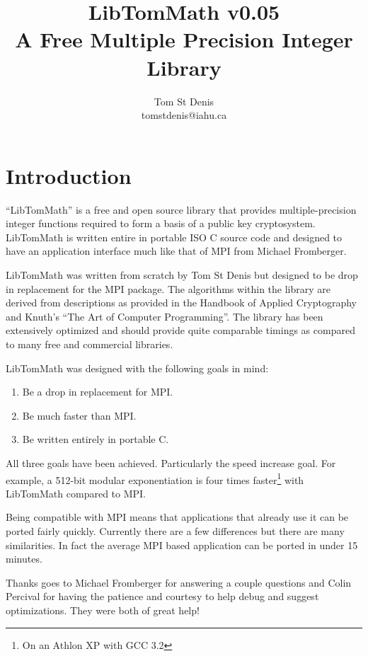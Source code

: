 \documentclass{article}
\begin{document}
\title{LibTomMath v0.05 \\ A Free Multiple Precision Integer Library}
\author{Tom St Denis \\ tomstdenis@iahu.ca}
\maketitle
\newpage

\section{Introduction}
``LibTomMath'' is a free and open source library that provides multiple-precision integer functions required to form a basis
of a public key cryptosystem.  LibTomMath is written entire in portable ISO C source code and designed to have an application
interface much like that of MPI from Michael Fromberger.  

LibTomMath was written from scratch by Tom St Denis but designed to be  drop in replacement for the MPI package.  The 
algorithms within the library are derived from descriptions as provided in the Handbook of Applied Cryptography and Knuth's
``The Art of Computer Programming''.  The library has been extensively optimized and should provide quite comparable 
timings as compared to many free and commercial libraries.

LibTomMath was designed with the following goals in mind:
\begin{enumerate}
\item Be a drop in replacement for MPI.
\item Be much faster than MPI.
\item Be written entirely in portable C.
\end{enumerate}

All three goals have been achieved.  Particularly the speed increase goal.  For example, a 512-bit modular exponentiation is
four times faster\footnote{On an Athlon XP with GCC 3.2} with LibTomMath compared to MPI.

Being compatible with MPI means that applications that already use it can be ported fairly quickly.  Currently there are 
a few differences but there are many similarities.  In fact the average MPI based application can be ported in under 15
minutes.  

Thanks goes to Michael Fromberger for answering a couple questions and Colin Percival for having the patience and courtesy to
help debug and suggest optimizations.  They were both of great help!
\end{document}
